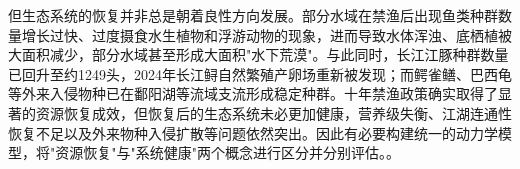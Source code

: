 但生态系统的恢复并非总是朝着良性方向发展。部分水域在禁渔后出现鱼类种群数量增长过快、过度摄食水生植物和浮游动物的现象，进而导致水体浑浊、底栖植被大面积减少，部分水域甚至形成大面积"水下荒漠"。与此同时，长江江豚种群数量已回升至约1249头，2024年长江鲟自然繁殖产卵场重新被发现；而鳄雀鳝、巴西龟等外来入侵物种已在鄱阳湖等流域支流形成稳定种群。十年禁渔政策确实取得了显著的资源恢复成效，但恢复后的生态系统未必更加健康，营养级失衡、江湖连通性恢复不足以及外来物种入侵扩散等问题依然突出。因此有必要构建统一的动力学模型，将"资源恢复"与"系统健康"两个概念进行区分并分别评估。\cite{report2022,report2023}。

